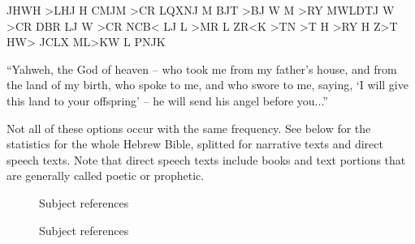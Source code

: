 \documentclass{report}
\newcommand{\cl}[2]{\begingroup\beginL\begingroup\color{#1}\beginR#2\endR\endgroup\endL\endgroup}
\begin{document}
\begin{itemize}
\begin{cjhebrew}
\cl{red}{JHWH >LHJ H CMJM >CR LQXNJ M BJT >BJ W M >RY MWLDTJ W >CR DBR LJ W >CR NCB< LJ L >MR L ZR<K >TN >T H >RY H Z>T} \\
HW> JCLX ML>KW L PNJK
\end{cjhebrew}

``Yahweh, the God of heaven -- who took me from my father’s house, and from the land of my birth, who spoke to me, and who swore to me, saying, `I will give this land to your offspring' -- he will send his angel before you...''
\end{itemize}

Not all of these options occur with the same frequency. See below for the statistics for the whole Hebrew Bible, splitted for narrative texts and direct speech texts. Note that direct speech texts include books and text portions that are generally called poetic or prophetic.
\begin{figure}

\caption{Subject references}
\end{figure}
\begin{figure}

\caption{Subject references}
\end{figure}
\end{document}
